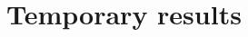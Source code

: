 \documentclass[11pt,a4paper]{report}
\begin{document}











\chapter{Temporary results}



%
%
\printbibliography
\end{document}
